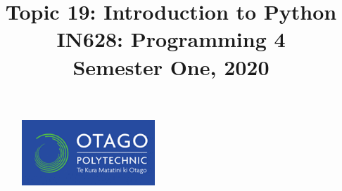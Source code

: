 \documentclass{article}
\author{}
\begin{document}
\begin{figure}
  \includegraphics[width=50mm]{../../resources/img/logo.png}
\end{figure}

\title{Topic 19: Introduction to Python\\IN628: Programming 4\\Semester One, 2020}
\date{}
\maketitle
\end{document}

